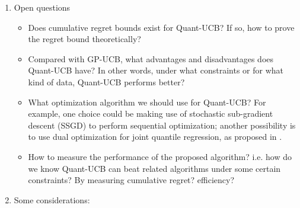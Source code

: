 \documentclass[11pt]{article}
\begin{document}
\begin{enumerate}
\item Open questions
    \begin{itemize}
        \item Does cumulative regret bounds exist for Quant-UCB? If so, how to prove the regret bound theoretically? 
        \item Compared with GP-UCB, what advantages and disadvantages does Quant-UCB have? In other words, under what constraints or for what kind of data, Quant-UCB performs better?
        \item What optimization algorithm we should use for Quant-UCB? For example, one choice could be making use of stochastic sub-gradient descent (SSGD) to perform sequential optimization; another possibility is to use dual optimization for joint quantile regression, as proposed in \cite{Sangnier:2016:JQR:3157382.3157511}.
        \item How to measure the performance of the proposed algorithm? i.e. how do we know Quant-UCB can beat related algorithms under some certain constraints? By measuring cumulative regret? efficiency? 
    \end{itemize}
    
\item Some considerations:



\end{enumerate}





\printbibliography
\end{document}
